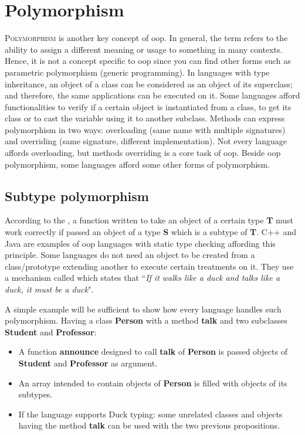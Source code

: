 \documentclass{KodeBook}
\begin{document}
\fi

\chapter{Polymorphism}

\begin{introduction}
	\lettrine{P}{olymorphism} is another key concept of \ac{oop}. 
	In general, the term refers to the ability to assign a different meaning or usage to something in many contexts.
	Hence, it is not a concept specific to \ac{oop} since you can find other forms such as parametric polymorphism (generic programming). 
	In languages with type inheritance, an object of a class can be considered as an object of its superclass; and therefore, the same applications can be executed on it.
	Some languages afford functionalities to verify if a certain object is instantiated from a class, to get its class or to cast the variable using it to another subclass.
	Methods can express polymorphism in two ways: overloading (same name with multiple signatures) and overriding (same signature, different implementation). 
	Not every language affords overloading, but methods overriding is a core task of \ac{oop}.
	Beside \ac{oop} polymorphism, some languages afford some other forms of polymorphism.
\end{introduction} 

\section{Subtype polymorphism}

According to the  \citep{1987-liskov}, a function written to take an object of a certain type \textbf{T} must work correctly if passed an object of a type \textbf{S} which is a subtype of \textbf{T}.
C++ and Java are examples of \ac{oop} languages with static type checking affording this principle. 
Some languages do not need an object to be created from a class/prototype extending another to execute certain treatments on it. 
They use a mechanism called  which states that ``\textit{If it walks like a duck and talks like a duck, it must be a duck}". 

A simple example will be sufficient to show how every language handles such polymorphism. 
Having a class \textbf{Person} with a method \textbf{talk} and two subclasses \textbf{Student} and \textbf{Professor}:
\begin{itemize}
	\item A function \textbf{announce} designed to call \textbf{talk} of \textbf{Person} is passed objects of \textbf{Student} and \textbf{Professor} as argument.
	\item An array intended to contain objects of \textbf{Person} is filled with objects of its subtypes.
	\item If the language supports Duck typing: some unrelated classes and objects having the method \textbf{talk} can be used with the two previous propositions.
\end{itemize}
\end{document}
